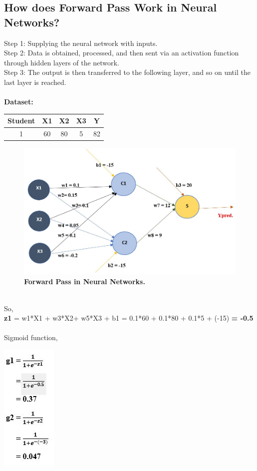 \documentclass{article}
\begin{document}
\subsection{How does Forward Pass Work in Neural Networks?}
Step 1: Supplying the neural network with inputs. \\
Step 2: Data is obtained, processed, and then sent via an activation function through hidden layers of the network. \\
Step 3: The output is then transferred to the following layer, and so on until the last layer is reached. \\
\\\textbf{Dataset:}
\begin{center}
\begin{tabular}{||c c c c c||} 
 \hline
 Student & X1 & X2 & X3 & Y \\ [0.5ex] 
 \hline\hline
 1 & 60 & 80 & 5 & 82 \\ 
 \hline
\end{tabular}
\end{center}
\begin{figure}[!htb]
    \centering
    \includegraphics[width=0.85\linewidth]{Forward Pass_Examples.JPG}
    \caption{\textbf{Forward Pass in Neural Networks.}}
    \label{fig:P1Q3b}
\end{figure}
\\So, \\
\textbf{z1} = w1*X1 + w3*X2+ w5*X3 + b1 
   = 0.1*60 + 0.1*80 + 0.1*5 + (-15)
   \textbf{= -0.5}\\
\pagebreak
   \\
   Sigmoid function,
   \begin{center}
        \includegraphics[width=0.25\linewidth]{Forward Pass_Equi.JPG}
   \end{center}
\end{document}
